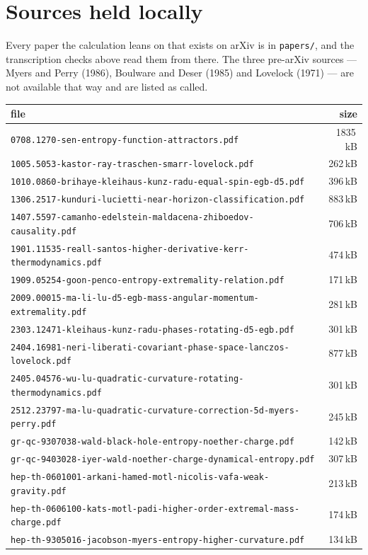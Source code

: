 \documentclass[11pt,a4paper]{article}
\begin{document}
\section*{Sources held locally}

Every paper the calculation leans on that exists on arXiv is in
\texttt{papers/}, and the transcription checks above read them from there. The
three pre-arXiv sources --- Myers and Perry (1986), Boulware and Deser (1985)
and Lovelock (1971) --- are not available that way and are listed as called.

\begin{center}
\small
\begin{tabular}{@{}lr@{}}
\toprule
file & size \\
\midrule
\texttt{0708.1270-sen-entropy-function-attractors.pdf} & 1835\,kB \\
\texttt{1005.5053-kastor-ray-traschen-smarr-lovelock.pdf} & 262\,kB \\
\texttt{1010.0860-brihaye-kleihaus-kunz-radu-equal-spin-egb-d5.pdf} & 396\,kB \\
\texttt{1306.2517-kunduri-lucietti-near-horizon-classification.pdf} & 883\,kB \\
\texttt{1407.5597-camanho-edelstein-maldacena-zhiboedov-causality.pdf} & 706\,kB \\
\texttt{1901.11535-reall-santos-higher-derivative-kerr-thermodynamics.pdf} & 474\,kB \\
\texttt{1909.05254-goon-penco-entropy-extremality-relation.pdf} & 171\,kB \\
\texttt{2009.00015-ma-li-lu-d5-egb-mass-angular-momentum-extremality.pdf} & 281\,kB \\
\texttt{2303.12471-kleihaus-kunz-radu-phases-rotating-d5-egb.pdf} & 301\,kB \\
\texttt{2404.16981-neri-liberati-covariant-phase-space-lanczos-lovelock.pdf} & 877\,kB \\
\texttt{2405.04576-wu-lu-quadratic-curvature-rotating-thermodynamics.pdf} & 301\,kB \\
\texttt{2512.23797-ma-lu-quadratic-curvature-correction-5d-myers-perry.pdf} & 245\,kB \\
\texttt{gr-qc-9307038-wald-black-hole-entropy-noether-charge.pdf} & 142\,kB \\
\texttt{gr-qc-9403028-iyer-wald-noether-charge-dynamical-entropy.pdf} & 307\,kB \\
\texttt{hep-th-0601001-arkani-hamed-motl-nicolis-vafa-weak-gravity.pdf} & 213\,kB \\
\texttt{hep-th-0606100-kats-motl-padi-higher-order-extremal-mass-charge.pdf} & 174\,kB \\
\texttt{hep-th-9305016-jacobson-myers-entropy-higher-curvature.pdf} & 134\,kB \\
\bottomrule
\end{tabular}
\end{center}
\end{document}
